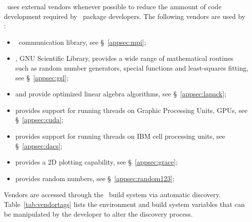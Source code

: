 \draco\ uses external vendors whenever possible to reduce the ammount
of code development required by \draco\ package developers.  The
following vendors are used by \draco:
\begin{itemize}
\item \mpi\ communication library, see \S~\ref{appsec:mpi};
\item {}, GNU Scientific Library, provides a wide range of mathematical routines such as random number generators, special functions and least-squares fitting, see \S~\ref{appsec:gsl};
\item {} and  provide optimized linear algebra algorithms, see \S~\ref{appsec:lapack};
\item {} provides support for running threads on Graphic Processing Units, GPUs, see \S~\ref{appsec:cuda};
\item {} provides support for running threads on IBM cell processing units, see \S~\ref{appsec:dacs};
\item {} provides a 2D plotting capability, see \S~\ref{appsec:grace};
\item {} provides random numbers, see \S~\ref{appsec:random123};
\end{itemize}
Vendors are accessed through the \draco\ build system via automatic discovery.  
Table~\ref{tab:vendortags} lists the environment and build system variables that can be manipulated by the developer to alter the discovery process.
